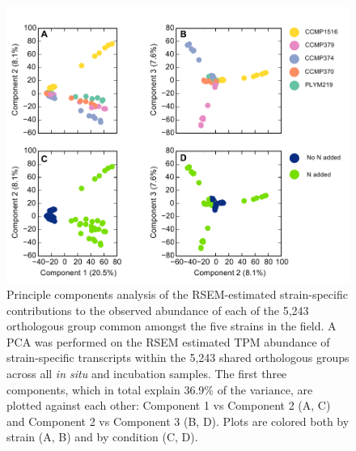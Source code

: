 \begin{figure}[h!]
  \centering
    \includegraphics[width=.8\textwidth]{Images/C5_Figure3_PCA.pdf}
    \caption[Principle components analysis of the strain-specific contributions to each of the 5,243 orthologous group common amongst the five strains]{Principle components analysis of the RSEM-estimated strain-specific contributions to the observed abundance of each of the 5,243 orthologous group common amongst the five strains in the field. A PCA was performed on the RSEM estimated TPM abundance of strain-specific transcripts within the 5,243 shared orthologous groups across all \textit{in situ} and incubation samples. The first three components, which in total explain 36.9\% of the variance, are plotted against each other: Component 1 vs Component 2 (A, C) and Component 2 vs Component 3 (B, D). Plots are colored both by strain (A, B) and by condition (C, D).}
  \label{fig:c5f3}
\end{figure}


